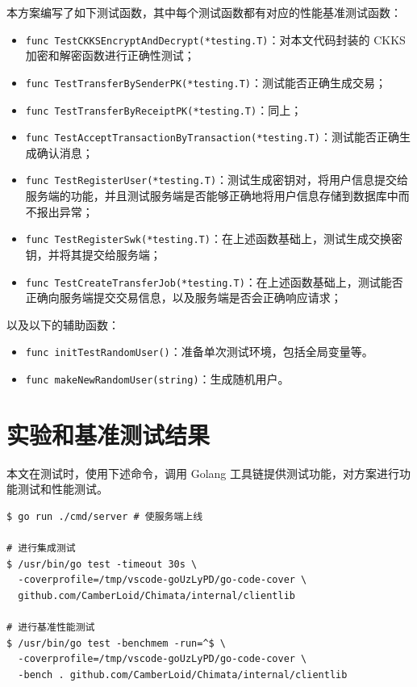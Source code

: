 本方案编写了如下测试函数，其中每个测试函数都有对应的性能基准测试函数：

\begin{itemize}
    \item \verb|func TestCKKSEncryptAndDecrypt(*testing.T)|：对本文代码封装的 CKKS 加密和解密函数进行正确性测试；
    \item \verb|func TestTransferBySenderPK(*testing.T)|：测试能否正确生成交易；
    \item \verb|func TestTransferByReceiptPK(*testing.T)|：同上；
    \item \verb|func TestAcceptTransactionByTransaction(*testing.T)|：测试能否正确生成确认消息；
    \item \verb|func TestRegisterUser(*testing.T)|：测试生成密钥对，将用户信息提交给服务端的功能，并且测试服务端是否能够正确地将用户信息存储到数据库中而不报出异常；
    \item \verb|func TestRegisterSwk(*testing.T)|：在上述函数基础上，测试生成交换密钥，并将其提交给服务端；
    \item \verb|func TestCreateTransferJob(*testing.T)|：在上述函数基础上，测试能否正确向服务端提交交易信息，以及服务端是否会正确响应请求；
\end{itemize}

以及以下的辅助函数：

\begin{itemize}
    \item \verb|func initTestRandomUser()|：准备单次测试环境，包括全局变量等。
    \item \verb|func makeNewRandomUser(string)|：生成随机用户。
\end{itemize}

\section{实验和基准测试结果}

本文在测试时，使用下述命令，调用 Golang 工具链提供测试功能，对方案进行功能测试和性能测试。

\begin{verbatim}
$ go run ./cmd/server # 使服务端上线

# 进行集成测试
$ /usr/bin/go test -timeout 30s \
  -coverprofile=/tmp/vscode-goUzLyPD/go-code-cover \
  github.com/CamberLoid/Chimata/internal/clientlib

# 进行基准性能测试
$ /usr/bin/go test -benchmem -run=^$ \
  -coverprofile=/tmp/vscode-goUzLyPD/go-code-cover \
  -bench . github.com/CamberLoid/Chimata/internal/clientlib
\end{verbatim}


